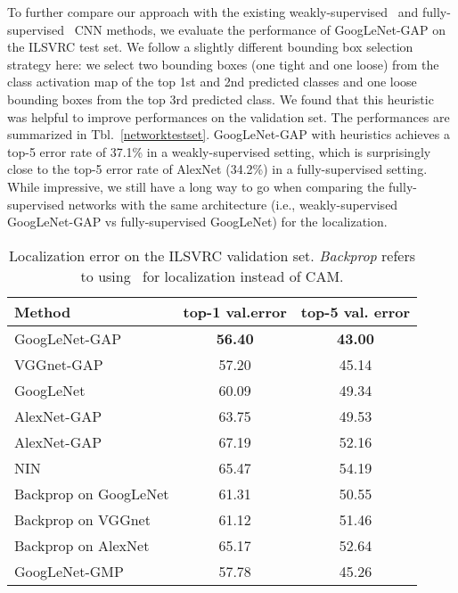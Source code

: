 \documentclass[10pt,twocolumn,letterpaper]{article}
\begin{document}
To further compare our approach with the existing weakly-supervised~\cite{simonyan2013deep} and fully-supervised~\cite{szegedy2014going,sermanet2013overfeat,szegedy2014going} CNN methods, we evaluate the performance of GoogLeNet-GAP on the ILSVRC test set. We follow a slightly different bounding box selection strategy here: we select two bounding boxes (one tight and one loose) from the class activation map of the top 1st and 2nd predicted classes and one loose bounding boxes from the top 3rd predicted class. We found that this heuristic was helpful to improve performances on the validation set. The performances are summarized in Tbl.~\ref{networktestset}. GoogLeNet-GAP with heuristics achieves a top-5 error rate of 37.1\% in a weakly-supervised setting, which is surprisingly close to the top-5 error rate of AlexNet (34.2\%) in a fully-supervised setting. While impressive, we still have a long way to go when comparing the fully-supervised networks with the same architecture (i.e., weakly-supervised GoogLeNet-GAP vs fully-supervised GoogLeNet) for the localization.


\begin{table}\caption{Localization error on the ILSVRC validation set. \textit{Backprop} refers to using~\cite{simonyan2013deep} for localization instead of CAM.}
\label{networkvalidationset}
\centering
\footnotesize
\begin{tabular}{ l | c | c }   
  \hline  
  \hline
  Method & top-1 val.error & top-5 val. error \\
    \hline  
  GoogLeNet-GAP&  \textbf{56.40} & \textbf{43.00} \\
  VGGnet-GAP& 57.20 & 45.14 \\
  GoogLeNet & 60.09 & 49.34\\      
  AlexNet-GAP & 63.75 & 49.53 \\     
  AlexNet-GAP & 67.19 & 52.16 \\
  NIN  & 65.47 & 54.19 \\
    \hline    
  Backprop on GoogLeNet & 61.31 & 50.55 \\  
  Backprop on VGGnet & 61.12 & 51.46 \\
  Backprop on AlexNet & 65.17 & 52.64 \\
  \hline  
    GoogLeNet-GMP  & 57.78 & 45.26 \\
    \hline 
\end{tabular}
\end{table}
\end{document}
